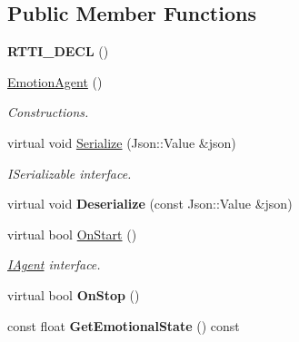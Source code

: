 \subsection*{Public Member Functions}
\begin{DoxyCompactItemize}
\item 
\mbox{\label{class_emotion_agent_a1f7279e7c1fc07df109c947794734814}} 
{\bfseries R\+T\+T\+I\+\_\+\+D\+E\+CL} ()
\item 
\mbox{\label{class_emotion_agent_a74570ffbdf84d550a482b2a3b9b88c1d}} 
\hyperlink{class_emotion_agent_a74570ffbdf84d550a482b2a3b9b88c1d}{Emotion\+Agent} ()
\begin{DoxyCompactList}\small\item\em Constructions. \end{DoxyCompactList}\item 
\mbox{\label{class_emotion_agent_a423209e01aa9d2823317a0a5af3f468b}} 
virtual void \hyperlink{class_emotion_agent_a423209e01aa9d2823317a0a5af3f468b}{Serialize} (Json\+::\+Value \&json)
\begin{DoxyCompactList}\small\item\em I\+Serializable interface. \end{DoxyCompactList}\item 
\mbox{\label{class_emotion_agent_a754713b176cf292986405269336b9541}} 
virtual void {\bfseries Deserialize} (const Json\+::\+Value \&json)
\item 
\mbox{\label{class_emotion_agent_a366a230b7ea3926a4b899cabb6476512}} 
virtual bool \hyperlink{class_emotion_agent_a366a230b7ea3926a4b899cabb6476512}{On\+Start} ()
\begin{DoxyCompactList}\small\item\em \hyperlink{class_i_agent}{I\+Agent} interface. \end{DoxyCompactList}\item 
\mbox{\label{class_emotion_agent_a991e85bfd0583a70e8668cd4388bbfb1}} 
virtual bool {\bfseries On\+Stop} ()
\item 
\mbox{\label{class_emotion_agent_a7fb8bdf10868cb62af2b849282db8a0f}} 
const float {\bfseries Get\+Emotional\+State} () const
\end{DoxyCompactItemize}
